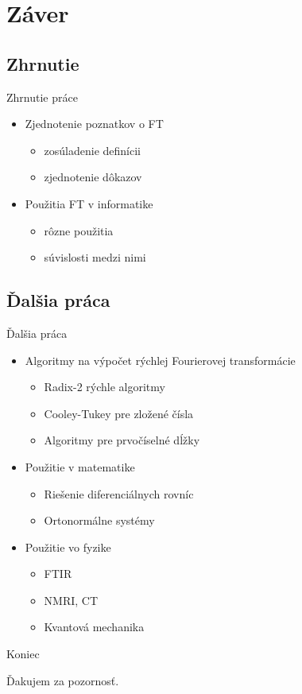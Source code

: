 \documentclass{beamer}
\begin{document}
\section{Záver}
\subsection{Zhrnutie}
\begin{frame}{Zhrnutie práce}
    \begin{itemize}
        \item Zjednotenie poznatkov o FT
            \begin{itemize}
                \item zosúladenie definícii
                \item zjednotenie dôkazov
            \end{itemize}
        \item Použitia FT v informatike
            \begin{itemize}
                \item rôzne použitia
                \item súvislosti medzi nimi
            \end{itemize}

    \end{itemize}
\end{frame}

\subsection{Ďalšia práca}
\begin{frame}{Ďalšia práca}
    \begin{itemize}
        \item Algoritmy na výpočet rýchlej Fourierovej transformácie
            \begin{itemize}
                \item Radix-2 rýchle algoritmy
                \item Cooley-Tukey pre zložené čísla
                \item Algoritmy pre prvočíselné dĺžky
            \end{itemize}
        \item Použitie v matematike
            \begin{itemize}
                \item Riešenie diferenciálnych rovníc
                \item Ortonormálne systémy
            \end{itemize}
        \item Použitie vo fyzike
            \begin{itemize}
                \item FTIR
                \item NMRI, CT
                \item Kvantová mechanika
            \end{itemize}
    \end{itemize}
\end{frame}


\begin{frame}{Koniec}
    \begin{table}
    \begin{centering}
        \large Ďakujem za pozornosť.
    \end{centering}
    \end{table}
\end{frame}
\end{document}
